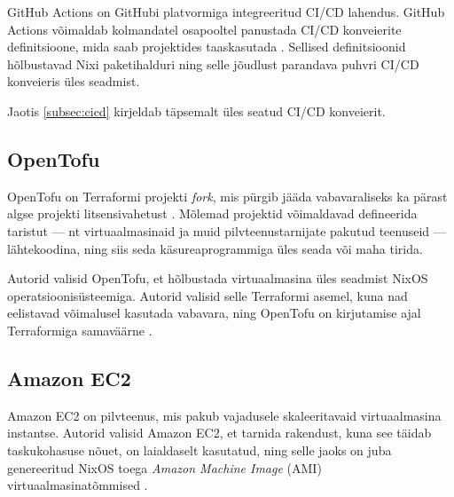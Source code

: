 GitHub Actions on GitHubi platvormiga integreeritud CI/CD lahendus. GitHub Actions võimaldab kolmandatel osapooltel panustada CI/CD konveierite definitsioone, mida saab projektides taaskasutada \cite{github-finding-actions}. Sellised definitsioonid hõlbustavad Nixi paketihalduri ning selle jõudlust parandava puhvri CI/CD konveieris üles seadmist.

Jaotis \ref{subsec:cicd} kirjeldab täpsemalt üles seatud CI/CD konveierit.

\subsection{OpenTofu}

OpenTofu on Terraformi projekti \emph{fork}, mis pürgib jääda vabavaraliseks ka pärast algse projekti litsensivahetust \cite{opentofu-faq-why}. Mõlemad projektid võimaldavad defineerida taristut — nt virtuaalmasinaid ja muid pilvteenustarnijate pakutud teenuseid — lähtekoodina, ning siis seda käsureaprogrammiga üles seada või maha tirida.

Autorid valisid OpenTofu, et hõlbustada virtuaalmasina üles seadmist NixOS operatsioonisüsteemiga. Autorid valisid selle Terraformi asemel, kuna nad eelistavad võimalusel kasutada vabavara, ning OpenTofu on kirjutamise ajal Terraformiga samaväärne \cite{opentofu-faq-terraform-replacement, opentofu-faq-state-file, opentofu-faq-providers}.

\subsection{Amazon EC2}

Amazon EC2 on pilvteenus, mis pakub vajadusele skaleeritavaid virtuaalmasina instantse. Autorid valisid Amazon EC2, et tarnida rakendust, kuna see täidab taskukohasuse nõuet, on laialdaselt kasutatud, ning selle jaoks on juba genereeritud NixOS toega \emph{Amazon Machine Image} (AMI) virtuaalmasinatõmmised \cite{nixos-amis}.

